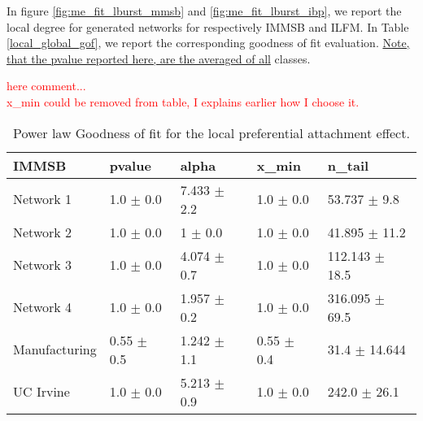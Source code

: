 \documentclass[a4paper, 12pt]{article}
\begin{document}
In figure \ref{fig:me_fit_lburst_mmsb} and \ref{fig:me_fit_lburst_ibp}, we report the local degree for generated networks for respectively IMMSB and ILFM. In Table \ref{local_global_gof}, we report the corresponding goodness of fit evaluation. \underline{Note, that the pvalue reported here, are the averaged of all} classes.


\textcolor{red}{here comment...} ~\\
\textcolor{red}{x\_min could be removed from table, I explains earlier how I choose it.}





\begin{table}
    \label{table:local_gof}
    \caption{Power law Goodness of fit for the local preferential attachment effect.}
\centering
    \begin{tabular}{lllll}                                                                                    
    \hline                                                                
        \textbf{IMMSB}  & pvalue         & alpha           & x\_min          & n\_tail             \\            
    \hline                                                                                                    
    Network 1     & 1.0 $\pm$ 0.0    & 7.433 $\pm$ 2.2 & 1.0 $\pm$ 0.0    & 53.737 $\pm$ 9.8   \\
    Network 2     & 1.0 $\pm$ 0.0    & 1 $\pm$ 0.0    & 1.0 $\pm$ 0.0    & 41.895 $\pm$ 11.2  \\                             
    Network 3     & 1.0 $\pm$ 0.0    & 4.074 $\pm$ 0.7 & 1.0 $\pm$ 0.0    & 112.143 $\pm$ 18.5 \\                
    Network 4     & 1.0 $\pm$ 0.0    & 1.957 $\pm$ 0.2 & 1.0 $\pm$ 0.0    & 316.095 $\pm$ 69.5 \\
    Manufacturing & 0.55 $\pm$ 0.5 & 1.242 $\pm$ 1.1 & 0.55 $\pm$ 0.4 & 31.4 $\pm$ 14.644    \\              
    UC Irvine     & 1.0 $\pm$ 0.0    & 5.213 $\pm$ 0.9 & 1.0 $\pm$ 0.0    & 242.0 $\pm$ 26.1   \\                
    \hline                                                                
    \end{tabular}    


\end{table}
\end{document}
